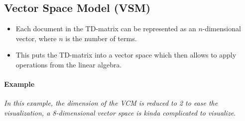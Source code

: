 \documentclass[a4paper, 11pt, accentcolor = tud3b]{tudreport}
\begin{document}
            \subsection{Vector Space Model (VSM)} %
                \begin{itemize}
                	\item Each document in the TD-matrix can be represented as an \(n\)-dimensional vector, where \(n\) is the number of terms.
                	\item This puts the TD-matrix into a vector space which then allows to apply operations from the linear algebra.
                \end{itemize}
            
            	\paragraph{Example}
            		\textit{In this example, the dimension of the VCM is reduced to 2 to ease the visualization, a 8-dimensional vector space is kinda complicated to visualize.}
            		
\end{document}
